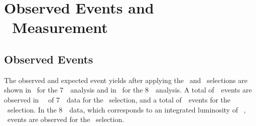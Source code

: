 \graphicspath{{Chapters/CrossSection/Figures/}}
\chapter{Observed Events and \CX\ Measurement}
\label{chap:CrossSection}

\section{Observed Events}

The observed and expected event yields after applying the \ZZ\ and \ZZs\ selections are shown
in~ for the 7~\tev\ analysis and
in~ for the 8~\tev\ analysis. 
A total
of~\ZZSevenTeVNObsZZLLLL\ events
are observed in \LumiPassGRLTwentyEleven~\ifb\ of 7~\tev\ data for the \ZZ\ selection, and a total of~\ZZSevenTeVNObsZZLLLL\ events for the \ZZs\ selection. In the 8~\tev\ data, which corresponds to an integrated luminosity of
\LumiPassGRLTwentyTwelve~\ifb, \ZZEightTeVNObsZZLLLL\ events are observed for
the \ZZ\ selection.

